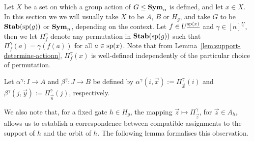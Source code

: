 \documentclass[../paper.tex]{subfiles}
\begin{document}


Let $X$ be a set on which a group action of $G \leq \text{\textbf{Sym}}_n$ is defined, and let
$x \in X$. In this section we we will usually take $X$ to be $A$, $B$ or $H_g$,
and take $G$ to be $\text{\textbf{Stab}} (\text{sp} (g))$ or $\text{\textbf{Sym}}_n$, depending on the context. Let $f
\in U^{\underline{\text{sp}(x)}}$ and $\gamma \in [n]^{\underline{U}}$, then we let
$\Pi^{\gamma}_{f}$ denote any permutation in $\text{\textbf{Stab}} (\text{sp} (g))$ such that
$\Pi^{\gamma}_f (a) = \gamma (f(a))$ for all $a \in \text{sp}(x)$. Note that from
Lemma~\ref{lem:support-determine-actionn}, $\Pi^{\gamma}_f(x)$ is well-defined
independently of the particular choice of permutation.

Let $\alpha^{\gamma}: I \rightarrow A$ and $\beta^{\gamma}: J \rightarrow B$ be
defined by $\alpha^{\gamma} (i, \vec{x}) := \Pi^{\gamma}_{\vec{x}}(i)$ and
$\beta^{\gamma} (j, \vec{y}) := \Pi^{\gamma}_{\vec{y}}(j)$, respectively.

We also note that, for a fixed gate $h \in H_g$, the mapping $\vec{z} \mapsto
\Pi^{\gamma}_{\vec{z}}$, for $\vec{z} \in A_h$, allows us to establish a
correspondence between compatible assignments to the support of $h$ and the
orbit of $h$. The following lemma formalises this observation.
\end{document}
